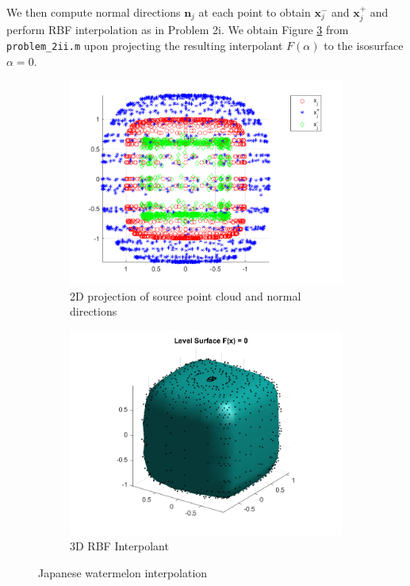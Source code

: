 \begin{solution}
  \pagebreak
  We then compute normal directions $\bm{n}_j$ at each point to obtain $\bm{x}^-_j$ and $\bm{x}^+_j$ and perform RBF
  interpolation as in Problem 2i. We obtain Figure \ref{fig:problem_2ii_rbf_interpolant} from \texttt{problem\_2ii.m}
  upon projecting the resulting interpolant $F(\alpha)$ to the isosurface $\alpha = 0$.

  \begin{figure}[h]
    \centering
    \begin{subfigure}{\textwidth}
        \centering
        \includegraphics*[width=.625\textwidth]{problem_2ii_normal_cloud_2d.png}
        \caption{2D projection of source point cloud and normal directions}
        \label{fig:problem_2ii_normal_cloud_2d}
    \end{subfigure}
    \begin{subfigure}{\textwidth}
        \centering
        \includegraphics*[width=.625\textwidth]{problem_2ii_rbf_surface.png}
        \caption{3D RBF Interpolant}
        \label{fig:problem_2ii_rbf_surface}
    \end{subfigure}
    \caption{Japanese watermelon interpolation}
    \label{fig:problem_2ii_rbf_interpolant}
  \end{figure}
\end{solution}